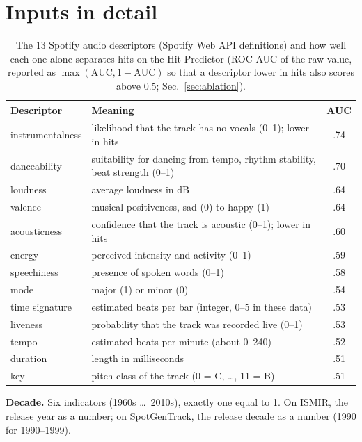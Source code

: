 \appendices

\FloatBarrier
\section{Inputs in detail}\label{app:inputs}

\begin{table}[!htbp]
\centering
\caption{The 13 Spotify audio descriptors (Spotify Web API definitions) and how well each one alone
separates hits on the Hit Predictor (ROC-AUC of the raw value, reported as $\max(\mathrm{AUC},1-\mathrm{AUC})$ so that a
descriptor lower in hits also scores above 0.5; Sec.~\ref{sec:ablation}).}
\label{tab:descriptors}
\footnotesize
\setlength{\tabcolsep}{3pt}
\begin{tabular}{@{}l>{\raggedright\arraybackslash}p{4.6cm}c@{}}
\toprule
Descriptor & Meaning & AUC \\
\midrule
instrumentalness & likelihood that the track has no vocals (0--1); lower in hits & .74 \\
danceability & suitability for dancing from tempo, rhythm stability, beat strength (0--1) & .70 \\
loudness & average loudness in dB & .64 \\
valence & musical positiveness, sad (0) to happy (1) & .64 \\
acousticness & confidence that the track is acoustic (0--1); lower in hits & .60 \\
energy & perceived intensity and activity (0--1) & .59 \\
speechiness & presence of spoken words (0--1) & .58 \\
mode & major (1) or minor (0) & .54 \\
time signature & estimated beats per bar (integer, 0--5 in these data) & .53 \\
liveness & probability that the track was recorded live (0--1) & .53 \\
tempo & estimated beats per minute (about 0--240) & .52 \\
duration & length in milliseconds & .51 \\
key & pitch class of the track (0 = C, \dots, 11 = B) & .51 \\
\bottomrule
\end{tabular}
\end{table}

\textbf{Decade.} Six indicators (1960s \dots\ 2010s), exactly one equal to 1. On ISMIR, the release year as
a number; on SpotGenTrack, the release decade as a number (1990 for 1990--1999).

